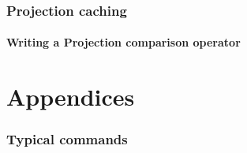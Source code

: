 \documentclass{JHEP3}
\begin{document}
\section{Projection caching}

\subsection{Writing a Projection comparison operator}



\cleardoublepage
\part{Appendices}
\appendix


\section{Typical  commands}
\label{app:agilerunmc}
\end{document}
